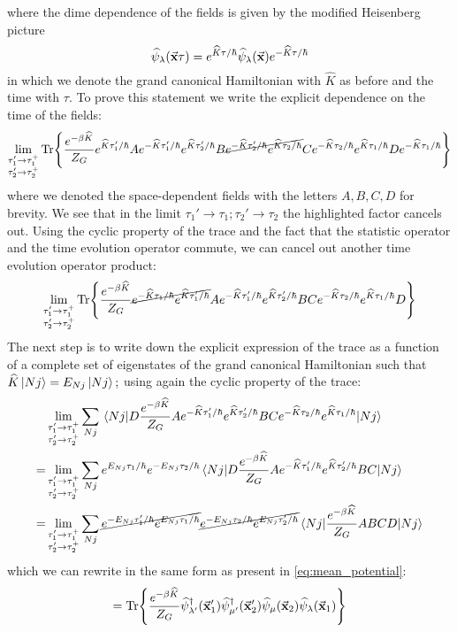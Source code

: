 \documentclass[a4paper]{article}
\renewcommand{\hat}{\widehat}
\newcommand{\stanis}{\frac{e^{-\beta\hat{K}}}{Z_G}}
\newcommand{\lisa}{\lim_{\substack{\tau_1'\rightarrow\tau_1^+\\\tau_2'\rightarrow\tau_2^+}}}
\begin{document}
where the dime dependence of the fields is given by the modified Heisenberg picture
\begin{equation}
\hat{\psi}_{\lambda}(\va{x}\tau) = e^{\hat{K}\tau/\hbar}\hat{\psi}_{\lambda}(\va{x})e^{-\hat{K}\tau/\hbar}
\end{equation}
in which we denote the grand canonical Hamiltonian with $\hat{K}$ as before and the time with $\tau.$
To prove this statement we write the explicit dependence on the time of the fields:
\begin{equation}
\lisa\Tr{\stanis e^{\hat{K}\tau_1'/\hbar}A e^{-\hat{K}\tau_1'/\hbar}e^{\hat{K}\tau_2'/\hbar}B \cancel{e^{-\hat{K}\tau_2'/\hbar}e^{\hat{K}\tau_2/\hbar}} C e^{-\hat{K}\tau_2/\hbar} e^{\hat{K}\tau_1/\hbar}D e^{-\hat{K}\tau_1/\hbar}}
\end{equation}
where we denoted the space-dependent fields with the letters $A,B,C,D$ for brevity.
We see that in the limit $\tau_1'\rightarrow\tau_1; \tau_2'\rightarrow\tau_2$ the highlighted factor cancels out.
Using the cyclic property of the trace and the fact that the statistic operator and the time evolution operator commute, we can cancel out another time evolution operator product:
\begin{equation}
\lisa\Tr{\stanis \cancel{e^{-\hat{K}\tau_1/\hbar} e^{\hat{K}\tau_1'/\hbar}}A e^{-\hat{K}\tau_1'/\hbar}e^{\hat{K}\tau_2'/\hbar}B  C e^{-\hat{K}\tau_2/\hbar} e^{\hat{K}\tau_1/\hbar}D }
\end{equation}
The next step is to write down the explicit expression of the trace as a function of a complete set of eigenstates of the grand canonical Hamiltonian such that $\hat{K}\ket{Nj} = E_{Nj}\ket{Nj};$ using again the cyclic property of the trace:
\begin{align}
&\lisa \sum_{Nj} \ev{D \stanis A e^{-\hat{K}\tau_1'/\hbar}e^{\hat{K}\tau_2'/\hbar}B  C e^{-\hat{K}\tau_2/\hbar} e^{\hat{K}\tau_1/\hbar}}{Nj}\\
=& \lisa \sum_{Nj} e^{E_{Nj}\tau_1/\hbar} e^{-E_{Nj}\tau_2/\hbar} \ev{D \stanis A e^{-\hat{K}\tau_1'/\hbar}e^{\hat{K}\tau_2'/\hbar}B  C }{Nj}\\
=& \lisa \sum_{Nj} \cancel{e^{-E_{Nj}\tau_1'/\hbar} e^{E_{Nj}\tau_1/\hbar}}\cancel{e^{-E_{Nj}\tau_2/\hbar} e^{E_{Nj}\tau_2'/\hbar}}\ev{\stanis A B  C  D}{Nj}
\end{align}
which we can rewrite in the same form as present in \eqref{eq:mean_potential}:
\begin{equation}
=\Tr{\frac{e^{-\beta\hat{K}}}{Z_G}\hat{\psi}^\dag_{\lambda'}(\va{x}_1')\hat{\psi}^\dag_{\mu'}(\va{x}_2')\hat{\psi}_\mu(\va{x}_2)\hat{\psi}_\lambda(\va{x}_1)}
\end{equation}
\end{document}
